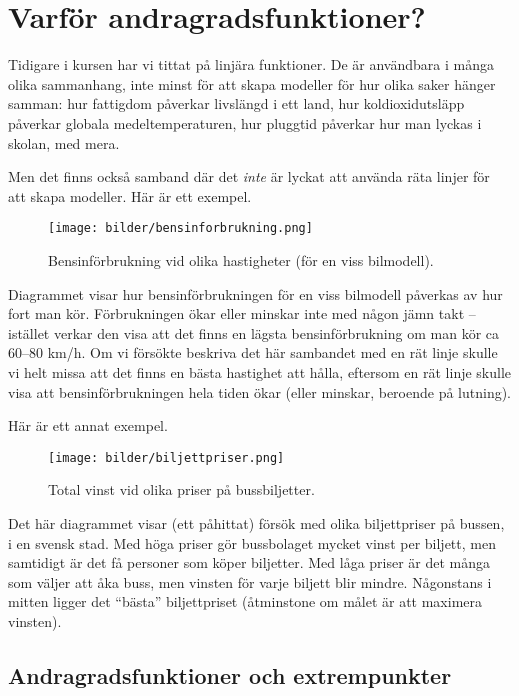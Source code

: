\section{Varför andragradsfunktioner?}

Tidigare i kursen har vi tittat på linjära funktioner.
De är användbara i många olika sammanhang, inte minst för att skapa modeller för hur olika saker hänger samman:
hur fattigdom påverkar livslängd i ett land, hur koldioxidutsläpp påverkar globala medeltemperaturen, hur pluggtid påverkar hur man lyckas i skolan, med mera.

Men det finns också samband där det \textit{inte} är lyckat att använda räta linjer för att skapa modeller.
Här är ett exempel.

\begin{figure}
  \centering
  \texttt{[image: bilder/bensinforbrukning.png]}
  \caption{\label{fig:bensinförbrukning}Bensinförbrukning vid olika hastigheter (för en viss bilmodell).}
\end{figure}

Diagrammet visar hur bensinförbrukningen för en viss bilmodell påverkas av hur fort man kör.
Förbrukningen ökar eller minskar inte med någon jämn takt -- istället verkar den visa att det finns en lägsta bensinförbrukning om man kör ca 60--80 km/h.
Om vi försökte beskriva det här sambandet med en rät linje skulle vi helt missa att det finns en bästa hastighet att hålla, eftersom en rät linje skulle visa att bensinförbrukningen hela tiden ökar (eller minskar, beroende på lutning).

Här är ett annat exempel.

\begin{figure}
  \centering
  \texttt{[image: bilder/biljettpriser.png]}
  \caption{\label{fig:biljettpriser}Total vinst vid olika priser på bussbiljetter.}
\end{figure}

Det här diagrammet visar (ett påhittat) försök med olika biljettpriser på bussen, i en svensk stad.
Med höga priser gör bussbolaget mycket vinst per biljett, men samtidigt är det få personer som köper biljetter.
Med låga priser är det många som väljer att åka buss, men vinsten för varje biljett blir mindre.
Någonstans i mitten ligger det ``bästa'' biljettpriset (åtminstone om målet är att maximera vinsten).

\subsection {Andragradsfunktioner och extrempunkter}

